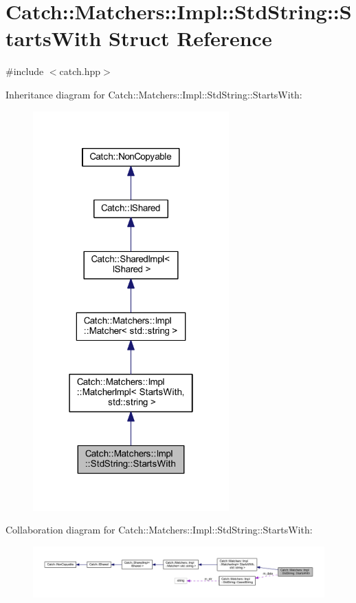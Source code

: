 \hypertarget{struct_catch_1_1_matchers_1_1_impl_1_1_std_string_1_1_starts_with}{}\section{Catch\+:\+:Matchers\+:\+:Impl\+:\+:Std\+String\+:\+:Starts\+With Struct Reference}
\label{struct_catch_1_1_matchers_1_1_impl_1_1_std_string_1_1_starts_with}


{\ttfamily \#include $<$catch.\+hpp$>$}



Inheritance diagram for Catch\+:\+:Matchers\+:\+:Impl\+:\+:Std\+String\+:\+:Starts\+With\+:\nopagebreak
\begin{figure}[H]
\begin{center}
\leavevmode
\includegraphics[width=214pt]{struct_catch_1_1_matchers_1_1_impl_1_1_std_string_1_1_starts_with__inherit__graph}
\end{center}
\end{figure}


Collaboration diagram for Catch\+:\+:Matchers\+:\+:Impl\+:\+:Std\+String\+:\+:Starts\+With\+:\nopagebreak
\begin{figure}[H]
\begin{center}
\leavevmode
\includegraphics[width=350pt]{struct_catch_1_1_matchers_1_1_impl_1_1_std_string_1_1_starts_with__coll__graph}
\end{center}
\end{figure}
